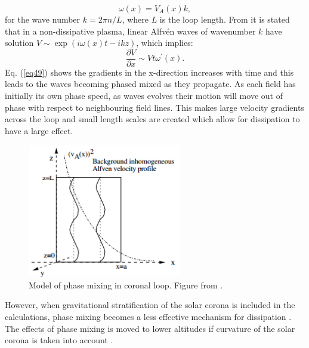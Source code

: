 \documentclass[12pt,a4paper,twoside]{article}
\newcommand{\Alfven}{Alfv\'{e}n }
\begin{document}
\begin{equation}
\omega(x) = V_A(x)k ,
\end{equation}     
for the wave number $k=2 \pi n / L$, where $L$ is the loop length. From \cite{Hood_1997_A} it is stated that in a non-dissipative plasma, linear \Alfven waves of wavenumber $k$ have solution $V \sim \exp(i \omega(x)t-ikz)$, which implies:
\begin{equation}\label{eq49}
\frac{\partial V}{\partial x} \sim Vt \omega^{\prime} (x).
\end{equation}
Eq. (\ref{eq49}) shows the gradients in the x-direction increases with time and this leads to the waves becoming phased mixed as they propagate. As each field has initially its own phase speed, as waves evolves their motion will move out of phase with respect to neighbouring field lines. This makes large velocity gradients across the loop and small length scales are created which allow for dissipation to have a large effect.        
\begin{figure}[h]
\centering
\includegraphics[width = 0.6\textwidth]{phase_mix}
\caption{ Model of phase mixing in coronal loop. Figure from \cite{Hood_1997_A}.}
\label{fig_13}
\end{figure}
However, when gravitational stratification of the solar corona is included in the calculations, phase mixing becomes a less effective mechanism for dissipation \citep{De_Moortel_1999_A}. The effects of phase mixing is moved to lower altitudes if curvature of the solar corona is taken into account \citep{De_Moortel_2000_A}.           
\end{document}
